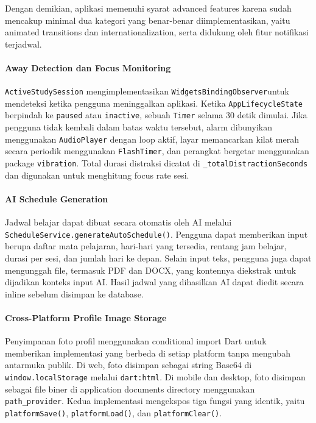 \documentclass[11pt]{article}
\begin{document}
Dengan demikian, aplikasi memenuhi syarat advanced features karena sudah mencakup minimal dua kategori yang benar-benar diimplementasikan, yaitu animated transitions dan internationalization, serta didukung oleh fitur notifikasi terjadwal.

\paragraph{Away Detection dan Focus Monitoring}

\texttt{ActiveStudySession} mengimplementasikan \texttt{WidgetsBindingObserver}\linebreak[1] untuk mendeteksi ketika pengguna meninggalkan aplikasi. Ketika \texttt{AppLifecycleState} berpindah ke \texttt{paused} atau \texttt{inactive}, sebuah \texttt{Timer} selama 30 detik dimulai. Jika pengguna tidak kembali dalam batas waktu tersebut, alarm dibunyikan menggunakan \texttt{AudioPlayer} dengan loop aktif, layar memancarkan kilat merah secara periodik menggunakan \texttt{FlashTimer}, dan perangkat bergetar menggunakan package \texttt{vibration}. Total durasi distraksi dicatat di \texttt{\_totalDistractionSeconds} dan digunakan untuk menghitung focus rate sesi.

\paragraph{AI Schedule Generation}

Jadwal belajar dapat dibuat secara otomatis oleh AI melalui \texttt{ScheduleService.generateAutoSchedule()}\linebreak[1]. Pengguna dapat memberikan input berupa daftar mata pelajaran, hari-hari yang tersedia, rentang jam belajar, durasi per sesi, dan jumlah hari ke depan. Selain input teks, pengguna juga dapat mengunggah file, termasuk PDF dan DOCX, yang kontennya diekstrak untuk dijadikan konteks input AI. Hasil jadwal yang dihasilkan AI dapat diedit secara inline sebelum disimpan ke database.

\paragraph{Cross-Platform Profile Image Storage}

Penyimpanan foto profil menggunakan conditional import Dart untuk memberikan implementasi yang berbeda di setiap platform tanpa mengubah antarmuka publik. Di web, foto disimpan sebagai string Base64 di \texttt{window.localStorage} melalui \texttt{dart:html}. Di mobile dan desktop, foto disimpan sebagai file biner di application documents directory menggunakan \texttt{path\_provider}. Kedua implementasi mengekspos tiga fungsi yang identik, yaitu \texttt{platformSave()}, \texttt{platformLoad()}, dan \texttt{platformClear()}.
\end{document}
